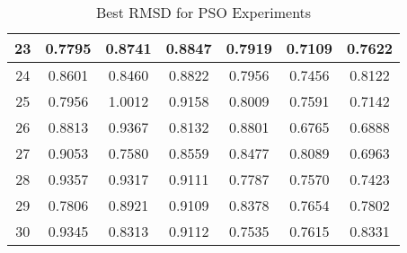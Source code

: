 \begin{table}
\begin{tabular}{ | c | c | c | c | c | c | c | }
		23 & 0.7795 & 0.8741 & 0.8847 & 0.7919 & 0.7109 & 0.7622 \\ \hline
		24 & 0.8601 & 0.8460 & 0.8822 & 0.7956 & 0.7456 & 0.8122 \\ \hline
		25 & 0.7956 & 1.0012 & 0.9158 & 0.8009 & 0.7591 & 0.7142 \\ \hline
		26 & 0.8813 & 0.9367 & 0.8132 & 0.8801 & 0.6765 & 0.6888 \\ \hline
		27 & 0.9053 & 0.7580 & 0.8559 & 0.8477 & 0.8089 & 0.6963 \\ \hline
		28 & 0.9357 & 0.9317 & 0.9111 & 0.7787 & 0.7570 & 0.7423 \\ \hline
		29 & 0.7806 & 0.8921 & 0.9109 & 0.8378 & 0.7654 & 0.7802 \\ \hline
		30 & 0.9345 & 0.8313 & 0.9112 & 0.7535 & 0.7615 & 0.8331 \\ \hline
	\end{tabular}
	\caption{Best RMSD for PSO Experiments}
\end{table}